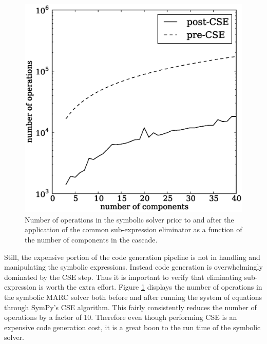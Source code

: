 \documentclass[preprint,12pt]{elsarticle}
\begin{document}
\begin{figure}[htpb]
\begin{center}
\includegraphics[scale=0.5]{numops.eps}
\caption{Number of operations in the symbolic solver prior to and after the 
    application of the common sub-expression eliminator as a function of the
    number of components in the cascade.}
\label{numops_fig}
\end{center}
\end{figure}

Still, the expensive portion of the code generation pipeline is not in handling 
and manipulating the symbolic expressions.  Instead code generation is overwhelmingly
dominated by the CSE step.  Thus it is important to verify that eliminating
sub-expression is worth the extra effort.  Figure \ref{numops_fig} displays the
number of operations in the symbolic MARC solver both before and after running the 
system of equations through SymPy's CSE algorithm.  This fairly consistently reduces
the number of operations by a factor of 10.   Therefore even though
performing CSE is an expensive code generation cost, it is a great boon to the 
run time of the symbolic solver.
\end{document}
